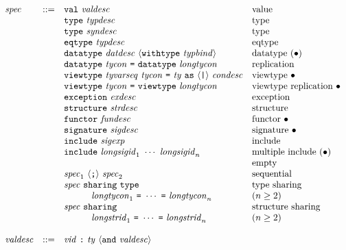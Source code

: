 \documentclass[twoside,titlepage]{article}
\begin{document}
\begin{appendix}
  $$
  \begin{array}{llll}
  \mathit{spec} & ::= & {\tt{val}}~\mathit{valdesc} & \textrm{value} \\
  && {\tt{type}}~\mathit{typdesc} & \textrm{type} \\
  && {\tt{type}}~\mathit{syndesc} & \textrm{type} \\
  && {\tt{eqtype}}~\mathit{typdesc} & \textrm{eqtype} \\
  && {\tt{datatype}}~\mathit{datdesc}~\langle{\tt{withtype}}~\mathit{typbind}\rangle & \textrm{datatype $(\bullet)$} \\
  && {\tt{datatype}}~\mathit{tycon}~\mbox{\tt=}~{\tt{datatype}}~\mathit{longtycon} & \textrm{replication} \\
  && {\tt{viewtype}}~\mathit{tyvarseq}~\mathit{tycon}~\mbox{\tt=}~\mathit{ty}~{\tt{as}}~\langle\mbox{\tt|}\rangle~\mathit{condesc} & \textrm{viewtype $\bullet$} \\
  && {\tt{viewtype}}~\mathit{tycon}~\mbox{\tt=}~{\tt{viewtype}}~\mathit{longtycon} & \textrm{viewtype replication $\bullet$} \\
  && {\tt{exception}}~\mathit{exdesc} & \textrm{exception} \\
  && {\tt{structure}}~\mathit{strdesc} & \textrm{structure} \\
  && {\tt{functor}}~\mathit{fundesc} & \textrm{functor $\bullet$} \\
  && {\tt{signature}}~\mathit{sigdesc} & \textrm{signature $\bullet$} \\
  && {\tt{include}}~\mathit{sigexp} & \textrm{include} \\
  && {\tt{include}}~\mathit{longsigid}_1~\cdots~\mathit{longsigid}_n & \textrm{multiple include $(\bullet)$} \\
  &&  & \textrm{empty} \\
  && \mathit{spec}_1~\langle\mbox{\tt;}\rangle~\mathit{spec}_2 & \textrm{sequential} \\
  && \mathit{spec}~{\tt{sharing}}~{\tt{type}}~ & \textrm{type sharing} \\
  && ~~~~~~~~~\mathit{longtycon}_1~\mbox{\tt=}~\cdots~\mbox{\tt=}~\mathit{longtycon}_n & (n\geq2) \\
  && \mathit{spec}~{\tt{sharing}}~ & \textrm{structure sharing} \\
  && ~~~~~~~~~\mathit{longstrid}_1~\mbox{\tt=}~\cdots~\mbox{\tt=}~\mathit{longstrid}_n & (n\geq2) \\
  \\
  \mathit{valdesc} & ::= & \mathit{vid}~\mbox{\tt:}~\mathit{ty}~\langle{\tt{and}}~\mathit{valdesc}\rangle \\

\end{array}$$
\end{appendix}
\end{document}
